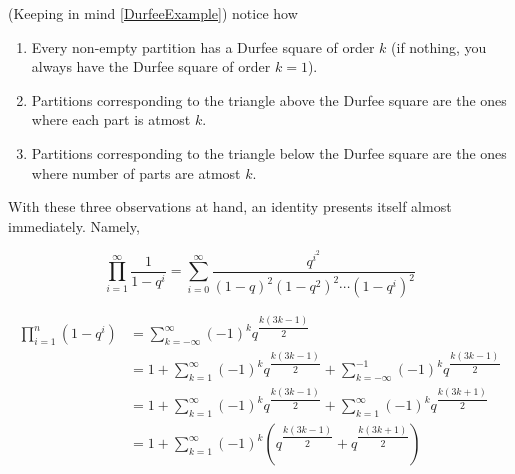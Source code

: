 (Keeping in mind \cref{DurfeeExample}) notice how
\begin{enumerate}
    \item Every non-empty partition has a Durfee square of order $k$ (if nothing, you always have the Durfee square of order $k=1$).
    \item Partitions corresponding to the triangle above the Durfee square are the ones where each part is atmost $k$.
    \item Partitions corresponding to the triangle below the Durfee square are the ones where number of parts are atmost $k$. 
\end{enumerate}
With these three observations at hand, an identity presents itself almost immediately. Namely,
\begin{claim}
    \[
    \prod_{i=1}^{\infty}\dfrac{1}{1-q^i} = \sum_{i=0}^{\infty}\dfrac{q^{i^2}}{(1-q)^2(1-q^2)^2\cdots(1-q^i)^2}
    \]
\end{claim}
\begin{theorem}
\begin{align*}
\prod_{i=1}^{n}(1-q^i) &= \sum_{k=-\infty}^{\infty}(-1)^k q^{\dfrac{k(3k-1)}{2}} \\
&= 1+\sum_{k=1}^{\infty}(-1)^kq^{\dfrac{k(3k-1)}{2}}+\sum_{k=-\infty}^{-1}(-1)^kq^{\dfrac{k(3k-1)}{2}} \\
&= 1+\sum_{k=1}^{\infty}(-1)^kq^{\dfrac{k(3k-1)}{2}}+\sum_{k=1}^{\infty}(-1)^kq^{\dfrac{k(3k+1)}{2}} \\
&= 1+\sum_{k=1}^{\infty}(-1)^k \left(q^{\dfrac{k(3k-1)}{2}}+q^{\dfrac{k(3k+1)}{2}}\right) \\
\end{align*}
\end{theorem}

\endinput
